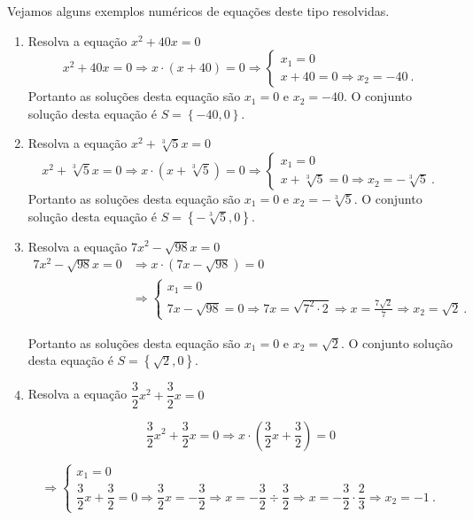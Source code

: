  \begin{exem} Vejamos alguns exemplos numéricos de equações deste tipo resolvidas.
 \begin{enumerate}[1)]
 \item Resolva a equação $x^2 + 40x=0$
 \[x^2 + 40x=0 \Rightarrow x \cdot (x+ 40)= 0 \Rightarrow
 \begin{cases}
 x_1=0 \\
 x+40=0 \Rightarrow x_2= -40 \ .
 \end{cases}
 \]
 Portanto as soluções desta equação são $x_1= 0$ e $x_2= -40$. O conjunto solução desta equação é $S= \left\{ -40, 0 \right\}$.

 \item Resolva a equação $x^2 + \sqrt[3]{5}x=0$
 \[x^2 + \sqrt[3]{5}x=0 \Rightarrow x \cdot (x+ \sqrt[3]{5})= 0 \Rightarrow
 \begin{cases}
 x_1=0 \\
 x+\sqrt[3]{5}=0 \Rightarrow x_2= -\sqrt[3]{5} \ .
 \end{cases}
 \]
 Portanto as soluções desta equação são $x_1= 0$ e $x_2= -\sqrt[3]{5}$. O conjunto solução desta equação é $S= \left\{ -\sqrt[3]{5}, 0 \right\}$.

 \item Resolva a equação $7x^2 - \sqrt{98}x=0$
\begin{align*}
7x^2 - \sqrt{98}x=0
& \Rightarrow x \cdot (7x - \sqrt{98})= 0 \\
& \Rightarrow
 \begin{cases}
 x_1=0 \\
 7x - \sqrt{98}=0
\Rightarrow 7x = \sqrt{7^2 \cdot 2}
\Rightarrow x= \frac{7\sqrt{2}}{7}
\Rightarrow x_2= \sqrt{2} \ .
 \end{cases}
\end{align*}

 Portanto as soluções desta equação são $x_1= 0$ e $x_2= \sqrt{2}$. O conjunto solução desta equação é $S= \left\{ \sqrt{2}, 0 \right\}$.

 \item Resolva a equação $\dfrac{3}{2}x^2 + \dfrac{3}{2}x=0$

 \[\dfrac{3}{2}x^2 + \dfrac{3}{2}x=0 \Rightarrow x \cdot (\dfrac{3}{2}x+ \dfrac{3}{2})= 0 \]

 \[\Rightarrow
 \begin{cases}
 x_1=0 \\
 \dfrac{3}{2}x + \dfrac{3}{2}=0 \Rightarrow \dfrac{3}{2}x= -\dfrac{3}{2} \Rightarrow x= -\dfrac{3}{2} \div \dfrac{3}{2} \Rightarrow x= -\dfrac{3}{2} \cdot \dfrac{2}{3} \Rightarrow x_2= -1 \ .
 \end{cases} \]


\end{enumerate}
\end{exem}
